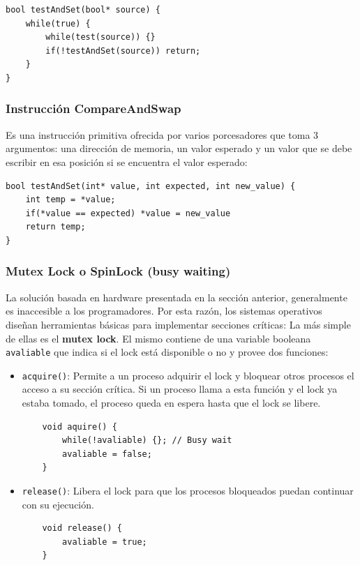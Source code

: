 \begin{center}
    \begin{minipage}{0.5\textwidth}
        \begin{verbatim}
bool testAndSet(bool* source) {
    while(true) {
        while(test(source)) {}
        if(!testAndSet(source)) return;
    }
}
        \end{verbatim}
    \end{minipage}
\end{center}

\subsubsection{Instrucción CompareAndSwap}\label{compareAndSwap}
Es una instrucción primitiva ofrecida por varios porcesadores que toma 3 argumentos: una dirección de memoria, un valor esperado y un valor que se debe escribir en esa posición si se encuentra el valor esperado:

        \begin{verbatim}
bool testAndSet(int* value, int expected, int new_value) {
    int temp = *value;
    if(*value == expected) *value = new_value
    return temp;
}
        \end{verbatim}

\subsubsection{Mutex Lock o SpinLock (busy waiting)} 
La solución basada en hardware presentada en la sección anterior, generalmente es inaccesible a los programadores. Por esta razón, los sistemas operativos diseñan herramientas básicas para implementar secciones críticas: La más simple de ellas es el \textbf{mutex lock}. El mismo contiene de una variable booleana \texttt{avaliable} que indica si el lock está disponible o no y provee dos funciones: 

\begin{itemize}
\item \texttt{acquire()}: Permite a un proceso adquirir el lock y bloquear otros procesos el acceso a su sección crítica. Si un proceso llama a esta función y el lock ya estaba tomado, el proceso queda en espera hasta que el lock se libere.

\begin{verbatim}
    void aquire() {
        while(!avaliable) {}; // Busy wait
        avaliable = false;	
    }
\end{verbatim}
\item \texttt{release()}: Libera el lock para que los procesos bloqueados puedan continuar con su ejecución.
\begin{verbatim}
    void release() {
        avaliable = true;	
    }
\end{verbatim}
\end{itemize}

